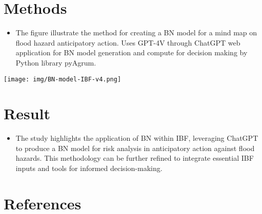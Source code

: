 \documentclass[a0paper,fleqn]{betterposter}
\begin{document}
{		\section{Methods}
		\begin{itemize}
			\item The figure illustrate the method for creating a BN model for a mind map on flood hazard anticipatory action. Uses  GPT-4V\cite{openai2023gpt4} through ChatGPT web application for BN model generation and compute for decision making by Python library pyAgrum\cite{hal-03135721}.
		\end{itemize}
		\begin{center}
			\texttt{[image: img/BN-model-IBF-v4.png]}
			\label{fig1}
		\end{center}
		
		
	    \section{Result}
		\begin{itemize}
			\item The study highlights the application of BN within IBF, leveraging ChatGPT to produce a BN model for risk analysis in anticipatory action against flood hazards. This methodology can be further refined to integrate essential IBF inputs and tools for informed decision-making.
		\end{itemize}
		\section{References}
		\renewcommand{\bibsection}{}                                                                                                               
		
		
	}	
\end{document}
